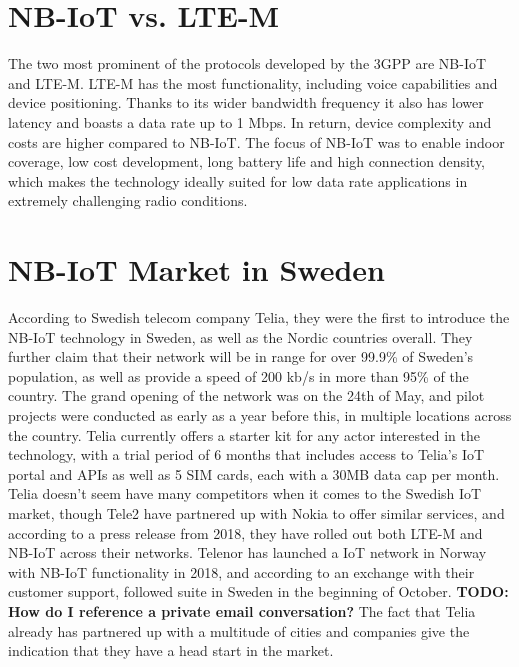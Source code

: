 \section{NB-IoT vs. LTE-M}
The two most prominent of the protocols developed by the 3GPP are NB-IoT and LTE-M. LTE-M has the most functionality, including voice capabilities and device positioning. Thanks to its wider bandwidth frequency it also has lower latency and boasts a data rate up to 1 Mbps.\cite{ericsson-blog} In return, device complexity and costs are higher compared to NB-IoT. The focus of NB-IoT was to enable indoor coverage, low cost development, long battery life and high connection density, which makes the technology ideally suited for low data rate applications in extremely challenging radio conditions. 

\section{NB-IoT Market in Sweden}
According to Swedish telecom company Telia, they were the first to introduce the NB-IoT technology in Sweden, as well as the Nordic countries overall.\cite{telia-nb} They further claim that their network will be in range for over 99.9\% of Sweden's population, as well as provide a speed of 200 kb/s in more than 95\% of the country.\cite{telia-first} The grand opening of the network was on the 24th of May, and pilot projects were conducted as early as a year before this, in multiple locations across the country. Telia currently offers a starter kit  for any actor interested in the technology, with a trial period of 6 months that includes access to Telia's IoT portal and APIs as well as 5 SIM cards, each with a 30MB data cap per month. Telia doesn't seem have many competitors when it comes to the Swedish IoT market, though Tele2 have partnered up with Nokia to offer similar services, and according to a press release from 2018, they have rolled out both LTE-M and NB-IoT across their networks.\cite{tele2-nokia} Telenor has launched a IoT network in Norway with NB-IoT functionality in 2018\cite{telenor-iot}, and according to an exchange with their customer support, followed suite in Sweden in the beginning of October. \textbf{TODO: How do I reference a private email conversation?} The fact that Telia already has partnered up with a multitude of cities and companies give the indication that they have a head start in the market.
